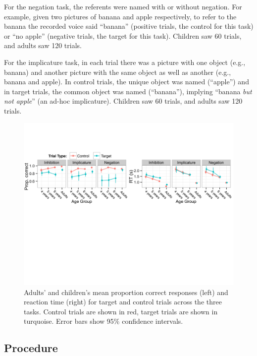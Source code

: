 \documentclass[man, noapacite]{apa2}
\begin{document}
For the negation task, the referents were named with or without negation. For example, given two pictures of banana and apple respectively, to refer to the banana the recorded voice said ``banana'' (positive trials, the control for this task) or ``no apple'' (negative trials, the target for this task). Children saw 60 trials, and adults saw 120 trials.

For the implicature task, in each trial there was a picture with one object (e.g., banana) and another picture with the same object as well as another (e.g., banana and apple). In control trials, the unique object was named (``apple'') and in target trials, the common object was named (``banana''), implying ``banana \emph{but not apple}'' (an ad-hoc implicature). Children saw 60 trials, and adults saw 120 trials.

\begin{figure}[t!]
\begin{center}
\includegraphics[width=\textwidth]{figures/correct_RT_v2.pdf}
\caption{\label{fig:traditional} Adults' and children's mean proportion correct responses (left) and reaction time (right) for target and control trials across the three tasks. Control trials are shown in red, target trials are shown in turquoise. Error bars show 95\% confidence intervals. }
\end{center}
\end{figure}

\subsection{Procedure}
\end{document}

